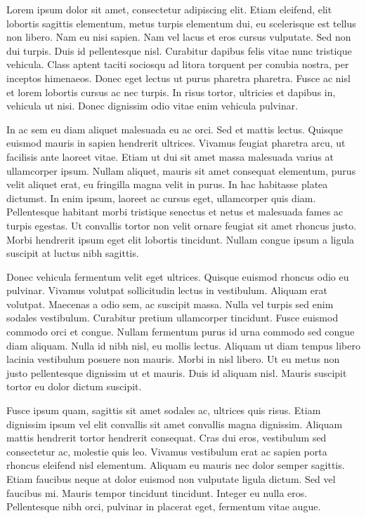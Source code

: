 \documentclass[draft=false]{book}
\begin{document}
Lorem ipsum dolor sit amet, consectetur adipiscing elit. Etiam eleifend, elit lobortis sagittis elementum, metus turpis elementum dui, eu scelerisque est tellus non libero. Nam eu nisi sapien. Nam vel lacus et eros cursus vulputate. Sed non dui turpis. Duis id pellentesque nisl. Curabitur dapibus felis vitae nunc tristique vehicula. Class aptent taciti sociosqu ad litora torquent per conubia nostra, per inceptos himenaeos. Donec eget lectus ut purus pharetra pharetra. Fusce ac nisl et lorem lobortis cursus ac nec turpis. In risus tortor, ultricies et dapibus in, vehicula ut nisi. Donec dignissim odio vitae enim vehicula pulvinar.

In ac sem eu diam aliquet malesuada eu ac orci. Sed et mattis lectus. Quisque euismod mauris in sapien hendrerit ultrices. Vivamus feugiat pharetra arcu, ut facilisis ante laoreet vitae. Etiam ut dui sit amet massa malesuada varius at ullamcorper ipsum. Nullam aliquet, mauris sit amet consequat elementum, purus velit aliquet erat, eu fringilla magna velit in purus. In hac habitasse platea dictumst. In enim ipsum, laoreet ac cursus eget, ullamcorper quis diam. Pellentesque habitant morbi tristique senectus et netus et malesuada fames ac turpis egestas. Ut convallis tortor non velit ornare feugiat sit amet rhoncus justo. Morbi hendrerit ipsum eget elit lobortis tincidunt. Nullam congue ipsum a ligula suscipit at luctus nibh sagittis. 

Donec vehicula fermentum velit eget ultrices. Quisque euismod rhoncus odio eu pulvinar. Vivamus volutpat sollicitudin lectus in vestibulum. Aliquam erat volutpat. Maecenas a odio sem, ac suscipit massa. Nulla vel turpis sed enim sodales vestibulum. Curabitur pretium ullamcorper tincidunt. Fusce euismod commodo orci et congue. Nullam fermentum purus id urna commodo sed congue diam aliquam. Nulla id nibh nisl, eu mollis lectus. Aliquam ut diam tempus libero lacinia vestibulum posuere non mauris. Morbi in nisl libero. Ut eu metus non justo pellentesque dignissim ut et mauris. Duis id aliquam nisl. Mauris suscipit tortor eu dolor dictum suscipit.

Fusce ipsum quam, sagittis sit amet sodales ac, ultrices quis risus. Etiam dignissim ipsum vel elit convallis sit amet convallis magna dignissim. Aliquam mattis hendrerit tortor hendrerit consequat. Cras dui eros, vestibulum sed consectetur ac, molestie quis leo. Vivamus vestibulum erat ac sapien porta rhoncus eleifend nisl elementum. Aliquam eu mauris nec dolor semper sagittis. Etiam faucibus neque at dolor euismod non vulputate ligula dictum. Sed vel faucibus mi. Mauris tempor tincidunt tincidunt. Integer eu nulla eros. Pellentesque nibh orci, pulvinar in placerat eget, fermentum vitae augue.
\end{document}
